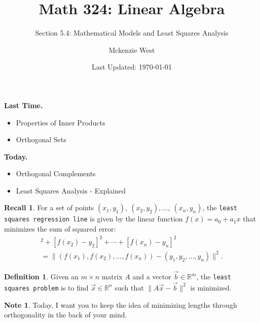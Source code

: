 \documentclass{beamer}
\newcommand{\R}{\mathbb{R}}
\newcommand{\fn}{\insertframenumber}
\theoremstyle{definition}
\newtheorem*{defn}{Definition}
\newtheorem*{nb}{Note}
\newtheorem*{recall}{Recall}
\renewcommand{\emph}[1]{{\color{blue}\texttt{#1}}}
\begin{document}
	\title{Math 324: Linear Algebra}
	\subtitle{Section 5.4: Mathematical Models and Least Squares Analysis}
	\author{Mckenzie West}
	\date{Last Updated: \today}
\begin{frame}
\maketitle
\end{frame}

\begin{frame}{\insertframenumber}
	\begin{block}{\textbf{Last Time.}}
	\begin{itemize}[label=--]
		\item Properties of Inner Products
		\item Orthogonal Sets
	\end{itemize}
	\end{block}
	\begin{block}{\textbf{Today.}}
		\begin{itemize}[label=--]
			\item Orthogonal Complements
			\item Least Squares Analysis - Explained
		\end{itemize}
	\end{block}
\end{frame}
\begin{frame}{\fn}
	\begin{recall}
		For a set of points $(x_1,y_1),\ (x_2,y_2),\dots,\ (x_n,y_n)$, the \emph{least squares regression line} is given by the linear function $f(x)=a_0+a_1x$ that minimizes the sum of squared error:
		\begin{multline*}
		[f(x_1)-y_1]^2+[f(x_2)-y_2]^2+\cdots+[f(x_n)-y_n]^2\\=\|(f(x_1),f(x_2),\dots,f(x_n))-(y_1,y_2,\dots,y_n)\|^2.
		\end{multline*}
	\end{recall}
	\begin{defn}
	Given an $m\times n$ matrix $A$ and a vector $\vec b\in\R^m$, the \emph{least squares problem} is to find $\vec x\in\R^n$ such that $\|A\vec x-\vec b\|^2$ is minimized.
	\end{defn}
\begin{nb}
	
		Today, I want you to keep the idea of minimizing lengths through orthogonality in the back of your mind.  
\end{nb}
\end{frame}
\end{document}
